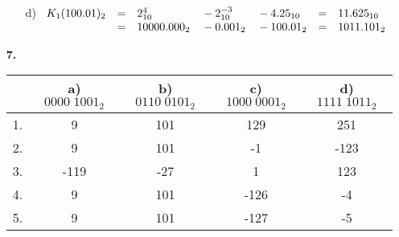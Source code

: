 \documentclass[a4paper,10pt]{scrartcl}
\begin{document}
\begin{enumerate}
\begin{enumerate}
            \item[d)]
                $\begin{array}[t]{rclllcl}
                    K_1(100.01)_2 &=& 2_{10}^4 &{}- 2_{10}^{-3} &{}- 4.25_{10} &=& 11.625_{10} \\
                    &=& 10000.000_2 &{}- 0.001_2 &{}- 100.01_2 &=& 1011.101_2
                \end{array}$
        \end{enumerate}

    \item[\textbf{7.}]
        \bgroup
        \def\arraystretch{1.5}
        \begin{tabular}[t]{|l|c|c|c|c|}
            \hline
            & a) $0000\;1001_2$ & b) $0110\;0101_2$ & c) $1000\;0001_2$ & d) $1111\;1011_2$\\
            \hline
            1. &  9  & 101 & 129 & 251 \\
            2. &  9  & 101 &  -1 &-123 \\
            3. &-119 & -27 &   1 & 123 \\
            4. &  9  & 101 &-126 &  -4 \\
            5. &  9  & 101 &-127 &  -5 \\
            \hline
        \end{tabular}
        \egroup

\end{enumerate}
\end{document}
